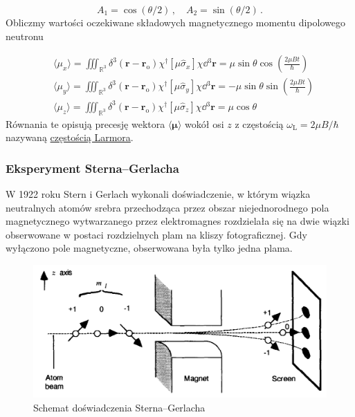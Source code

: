 \documentclass{myclass}
\begin{document}
\begin{equation*}
A_1=\cos(\theta/2)\,,\quad A_2=\sin(\theta/2)\,.
\end{equation*}
Obliczmy wartości oczekiwane składowych magnetycznego momentu dipolowego neutronu

\begin{equation*}
\begin{split}
    &\langle\mu_x\rangle=\iiint_{\mathbb{R}^3}\delta^3(\mathbf{r}-\mathbf{r}_\text{o})\chi^\dag[\mu\hat{\sigma}_x]\chi\dd{^3\mathbf{r}}=\mu\sin\theta\cos\left(\frac{2\mu Bt}{\hbar}\right)\\
    &\langle\mu_y\rangle=\iiint_{\mathbb{R}^3}\delta^3(\mathbf{r}-\mathbf{r}_\text{o})\chi^\dag[\mu\hat{\sigma}_y]\chi\dd{^3\mathbf{r}}=-\mu\sin\theta\sin\left(\frac{2\mu Bt}{\hbar}\right)\\
    &\langle\mu_z\rangle=\iiint_{\mathbb{R}^3}\delta^3(\mathbf{r}-\mathbf{r}_\text{o})\chi^\dag[\mu\hat{\sigma}_z]\chi\dd{^3\mathbf{r}}=\mu\cos\theta
\end{split}
\end{equation*}
Równania te opisują precesję wektora \(\langle\boldsymbol{\mu}\rangle\) wokół osi \(z\) z częstością
\(\boxed{\omega_\text{L}=2\mu B/\hbar}\) nazywaną \underline{częstością Larmora}.

\subsubsection{Eksperyment Sterna--Gerlacha}

W 1922 roku Stern i Gerlach wykonali doświadczenie, w którym wiązka neutralnych atomów srebra
przechodząca przez obszar niejednorodnego pola magnetycznego wytwarzanego przez elektromagnes
rozdzielała się na dwie wiązki obserwowane w postaci rozdzielnych plam na kliszy fotograficznej. Gdy
wyłączono pole magnetyczne, obserwowana była tylko jedna plama.

\begin{figure}[ht]
    \centering
    \includegraphics[scale=0.25]{diag/stern-gerlach.png}
    \caption{Schemat doświadczenia Sterna--Gerlacha}
    \label{fig:stern-gerlach}
\end{figure}
\end{document}
